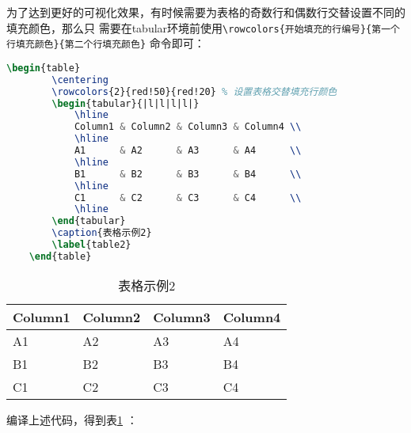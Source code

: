 为了达到更好的可视化效果，有时候需要为表格的奇数行和偶数行交替设置不同的填充颜色，那么只
需要在tabular环境前使用\texttt{\textbackslash{}rowcolors\{开始填充的行编号\}\{第一个行填充颜色\}\{第二个行填充颜色\}}
命令即可：
\begin{lstlisting}[language=TeX]
    \begin{table}
        \centering
        \rowcolors{2}{red!50}{red!20} % 设置表格交替填充行颜色
        \begin{tabular}{|l|l|l|l|}
            \hline
            Column1 & Column2 & Column3 & Column4 \\
            \hline
            A1      & A2      & A3      & A4      \\
            \hline
            B1      & B2      & B3      & B4      \\
            \hline
            C1      & C2      & C3      & C4      \\
            \hline
        \end{tabular}
        \caption{表格示例2}
        \label{table2}
    \end{table}
\end{lstlisting}

\begin{table}
    \centering
    \begin{tabular}{|l|l|l|l|}
        \hline
        Column1 & Column2 & Column3 & Column4 \\
        \hline
        A1      & A2      & A3      & A4      \\
        \hline
        B1      & B2      & B3      & B4      \\
        \hline
        C1      & C2      & C3      & C4      \\
        \hline
    \end{tabular}
    \caption{表格示例2}
    \label{table2}
\end{table}
编译上述代码，得到表\ref{table2} ：

